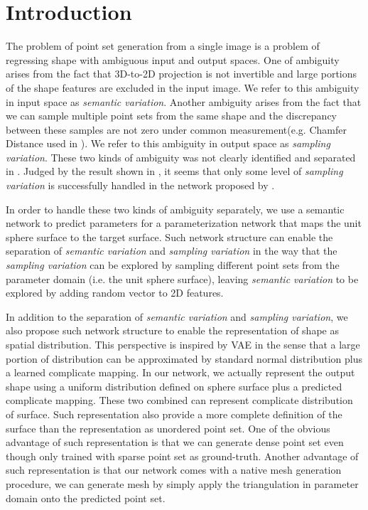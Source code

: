 \section{Introduction}
The problem of point set generation from a single image is a problem of regressing shape with ambiguous input and output spaces. One of ambiguity arises from the fact that 3D-to-2D projection is not invertible and large portions of the shape features are excluded in the input image. We refer to this ambiguity in input space as \textit{semantic variation}. Another ambiguity arises from the fact that we can sample multiple point sets from the same shape and the discrepancy between these samples are not zero under common measurement(e.g. Chamfer Distance used in \citep{PSGN}). We refer to this ambiguity in output space as \textit{sampling variation}. These two kinds of ambiguity was not clearly identified and separated in \citep{PSGN}. Judged by the result shown in \citep{PSGN}, it seems that only some level of \textit{sampling variation} is successfully handled in the network proposed by \citep{PSGN}.

In order to handle these two kinds of ambiguity separately, we use a semantic network to predict parameters for a parameterization network that maps the unit sphere surface to the target surface. Such network structure can enable the separation of \textit{semantic variation} and \textit{sampling variation} in the way that the \textit{sampling variation} can be explored by sampling different point sets from the parameter domain (i.e. the unit sphere surface), leaving \textit{semantic variation} to be explored by adding random vector to 2D features.

In addition to the separation of \textit{semantic variation} and \textit{sampling variation}, we also propose such network structure to enable the representation of shape as spatial distribution. This perspective is inspired by VAE\citep{VAE} in the sense that a large portion of distribution can be approximated by standard normal distribution plus a learned complicate mapping. In our network, we actually represent the output shape using a uniform distribution defined on sphere surface plus a predicted complicate mapping. These two combined can represent complicate distribution of surface. Such representation also provide a more complete definition of the surface than the representation as unordered point set. One of the obvious advantage of such representation is that we can generate dense point set even though only trained with sparse point set as ground-truth. Another advantage of such representation is that our network comes with a native mesh generation procedure, we can generate mesh by simply apply the triangulation in parameter domain onto the predicted point set.

